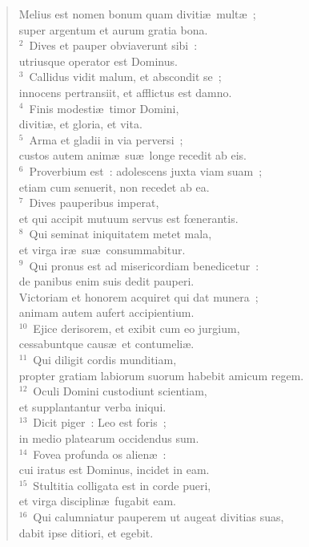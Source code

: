 \begin{flushleft}\begin{verse}\vspace{-19pt}\hspace{6pt}Melius est nomen bonum quam diviti\ae\ mult\ae~;\\\hspace{6pt} super argentum et aurum gratia bona.\\
${}^{2}$~Dives et pauper obviaverunt sibi~:\\ utriusque operator est Dominus.\\
${}^{3}$~Callidus vidit malum, et abscondit se~;\\ innocens pertransiit, et afflictus est damno.\\
${}^{4}$~Finis modesti\ae\ timor Domini,\\ diviti\ae , et gloria, et vita.\\
${}^{5}$~Arma et gladii in via perversi~;\\ custos autem anim\ae\ su\ae\ longe recedit ab eis.\\
${}^{6}$~Proverbium est~: adolescens juxta viam suam~;\\ etiam cum senuerit, non recedet ab ea.\\
${}^{7}$~Dives pauperibus imperat,\\ et qui accipit mutuum servus est fœnerantis.\\
${}^{8}$~Qui seminat iniquitatem metet mala,\\ et virga ir\ae\ su\ae\ consummabitur.\\
${}^{9}$~Qui pronus est ad misericordiam benedicetur~:\\ de panibus enim suis dedit pauperi.\\ Victoriam et honorem acquiret qui dat munera~;\\ animam autem aufert accipientium.\\
${}^{10}$~Ejice derisorem, et exibit cum eo jurgium,\\ cessabuntque caus\ae\ et contumeli\ae .\\
${}^{11}$~Qui diligit cordis munditiam,\\ propter gratiam labiorum suorum habebit amicum regem.\\
${}^{12}$~Oculi Domini custodiunt scientiam,\\ et supplantantur verba iniqui.\\
${}^{13}$~Dicit piger~: Leo est foris~;\\ in medio platearum occidendus sum.\\
${}^{14}$~Fovea profunda os alien\ae~:\\ cui iratus est Dominus, incidet in eam.\\
${}^{15}$~Stultitia colligata est in corde pueri,\\ et virga disciplin\ae\ fugabit eam.\\
${}^{16}$~Qui calumniatur pauperem ut augeat divitias suas,\\ dabit ipse ditiori, et egebit.\end{verse}\end{flushleft}



